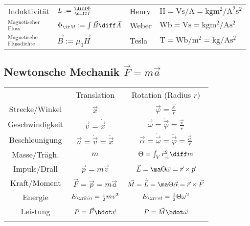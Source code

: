 \documentclass[fs, german]{latex4ei_fs}
\begin{document}
\begin{sectionbox}
\begin{tabular}{llll}
		Induktivität & $L := \frac{\diff \Phi}{\diff I}$ & Henry & $\si{\henry} = \si{\volt\second \per\ampere} = \si{\kilogram\meter  \squared \per \ampere  \squared \second  \squared}$\\
		${}^{\text{Magnetischer}}_{\textstyle \text{Fluss}}$ & $\Phi_{\ir M} := \int \vec B \diff \vec A$ & Weber & $\si{\weber} = \si{\volt\second} = \si{\kilogram\meter \squared \per \ampere\second \squared}$\\[0.2em]
		${}^{\text{Magnetische}}_{\textstyle \text{Flussdichte}}$ & $\vec B := \mu_0 \vec H$ & Tesla & $\si{\tesla} = \si{\weber \per \meter  \squared} = \si{\kilogram \per \ampere\second \squared}$\\
\end{tabular}
\end{sectionbox}
\begin{sectionbox}
	\subsection{Newtonsche Mechanik $\vec F=m \vec a $}
	\begin{tabular}{ccc} \ctrule
				& \large Translation & {\large Rotation} (Radius $r$) \\ \cmrule
		Strecke/Winkel & \large $\vec x$ & \large $\vec \varphi =  \frac{\vec x}{r}$\\[0.2em]
		Geschwindigkeit & \large $\vec v = \dot{\vec x}$ & \large $\vec \omega = \dot{\vec \varphi} = \frac{\vec v}{r}$ \\[0.2em]
		Beschleunigung & \large $\vec a = \dot{\vec v} = \ddot{\vec x}$ & \large $\vec \alpha = \dot{\vec \omega} = \ddot{\vec \varphi} = \frac{\vec a}{r}$ \\[0.2em]
		Masse/Trägh. & \large $m$ & \large $\Theta = \int_V \vec r^2_\perp \diff m$ \\[0.2em]
		Impuls/Drall & \large $\vec p =m \vec v$ & \large $\vec L = \ma \Theta \vec \omega = \vec r \times \vec p$ \\[0.2em]
		Kraft/Moment & \large $\vec F = \dot{\vec p} = m \vec a$ &  \large $\vec M = \dot{\vec L} = \ma \Theta \vec \alpha = \vec r \times \vec F$ \\[0.2em]
		Energie & \large $E_{\ir kin}=\frac12mv^2$ & \large $E_{\ir rot}=\frac12 \Theta \omega ^2$\\[0.2em]
		Leistung & \large $P = \vec F \bdot \vec v$ & \large $P = \vec M \bdot \vec \omega$\\ \cbrule
	\end{tabular}
\end{sectionbox}
\end{document}

